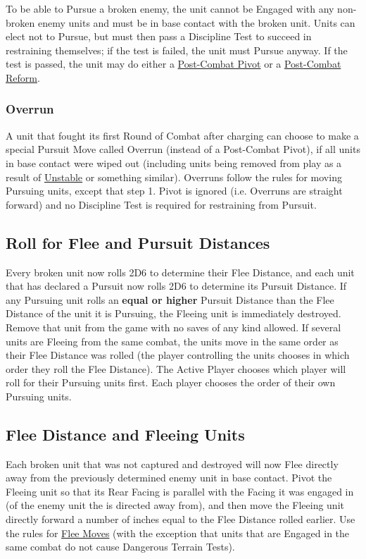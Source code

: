 To be able to Pursue a broken enemy, the unit cannot be Engaged with any non-broken enemy units and must be in base contact with the broken unit. Units can elect not to Pursue, but must then pass a Discipline Test to succeed in restraining themselves; if the test is failed, the unit must Pursue anyway. If the test is passed, the unit may do either a \hyperref[post_combat_pivot]{Post-Combat Pivot} or a \hyperref[post_combat_reform]{Post-Combat Reform}.

\subsubsection{Overrun}
\label{overrun}

A unit that fought its first Round of Combat after charging  can choose to make a special Pursuit Move called Overrun (instead of a Post-Combat Pivot), if all units in base contact were wiped out (including units being removed from play as a result of \hyperref[unstable]{Unstable} or something similar). Overruns follow the rules for moving Pursuing units, except that step 1. Pivot is ignored (i.e. Overruns are straight forward) and no Discipline Test is required for restraining from Pursuit.

\subsection{Roll for Flee and Pursuit Distances}

Every broken unit now rolls 2D6 to determine their Flee Distance, and each unit that has declared a Pursuit now rolls 2D6 to determine its Pursuit Distance. If any Pursuing unit rolls an \textbf{equal or higher} Pursuit Distance than the Flee Distance of the unit it is Pursuing, the Fleeing unit is immediately destroyed. Remove that unit from the game with no saves of any kind allowed. If several units are Fleeing from the same combat, the units move in the same order as their Flee Distance was rolled (the player controlling the units chooses in which order they roll the Flee Distance). The Active Player chooses which player will roll for their Pursuing units first. Each player chooses the order of their own Pursuing units. 

\subsection{Flee Distance and Fleeing Units}

Each broken unit that was not captured and destroyed will now Flee directly away from the previously determined enemy unit in base contact. Pivot the Fleeing unit so that its Rear Facing is parallel with the Facing it was engaged in (of the enemy unit the  is directed away from), and then move the Fleeing unit directly forward a number of inches equal to the Flee Distance rolled earlier. Use the rules for \hyperref[flee_moves]{Flee Moves} (with the exception that units that are Engaged in the same combat do not cause Dangerous Terrain Tests).

